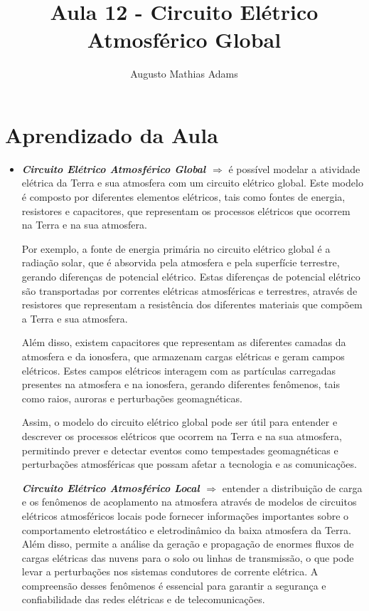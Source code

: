 \documentclass[a4paper, 12pt, onecolumn,singlespacing]{article}
\title{Aula 12 - Circuito Elétrico Atmosférico Global}
\author[1]{Augusto Mathias Adams}
\affil[1]{augusto.adams@ufpr.br}
\begin{document}
	
	\maketitle
	
	\section{Aprendizado da Aula}
	
	\begin{itemize}
		
		\item \textbf{\textit{Circuito Elétrico Atmosférico Global $\Rightarrow$ }}é possível modelar a atividade elétrica da Terra e sua atmosfera com um circuito elétrico global. Este modelo é composto por diferentes elementos elétricos, tais como fontes de energia, resistores e capacitores, que representam os processos elétricos que ocorrem na Terra e na sua atmosfera.
		
		Por exemplo, a fonte de energia primária no circuito elétrico global é a radiação solar, que é absorvida pela atmosfera e pela superfície terrestre, gerando diferenças de potencial elétrico. Estas diferenças de potencial elétrico são transportadas por correntes elétricas atmosféricas e terrestres, através de resistores que representam a resistência dos diferentes materiais que compõem a Terra e sua atmosfera.
		
		Além disso, existem capacitores que representam as diferentes camadas da atmosfera e da ionosfera, que armazenam cargas elétricas e geram campos elétricos. Estes campos elétricos interagem com as partículas carregadas presentes na atmosfera e na ionosfera, gerando diferentes fenômenos, tais como raios, auroras e perturbações geomagnéticas.
		
		Assim, o modelo do circuito elétrico global pode ser útil para entender e descrever os processos elétricos que ocorrem na Terra e na sua atmosfera, permitindo prever e detectar eventos como tempestades geomagnéticas e perturbações atmosféricas que possam afetar a tecnologia e as comunicações.
		
		\subitem \textbf{\textit{Circuito Elétrico Atmosférico Local $\Rightarrow$ }}entender a distribuição de carga e os fenômenos de acoplamento na atmosfera através de modelos de circuitos elétricos atmosféricos locais pode fornecer informações importantes sobre o comportamento eletrostático e eletrodinâmico da baixa atmosfera da Terra. Além disso, permite a análise da geração e propagação de enormes fluxos de cargas elétricas das nuvens para o solo ou linhas de transmissão, o que pode levar a perturbações nos sistemas condutores de corrente elétrica. A compreensão desses fenômenos é essencial para garantir a segurança e confiabilidade das redes elétricas e de telecomunicações.
		

\end{itemize}
\end{document}
